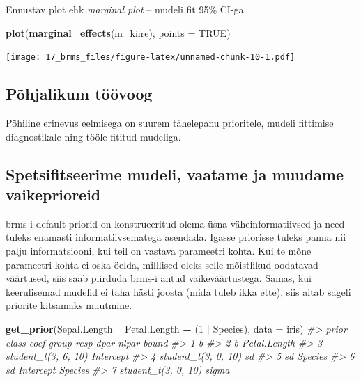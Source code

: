 \documentclass[]{book}
\newenvironment{Shaded}{\begin{snugshade}}{\end{snugshade}}
\newcommand{\KeywordTok}[1]{\textcolor[rgb]{0.13,0.29,0.53}{\textbf{#1}}}
\newcommand{\DataTypeTok}[1]{\textcolor[rgb]{0.13,0.29,0.53}{#1}}
\newcommand{\DecValTok}[1]{\textcolor[rgb]{0.00,0.00,0.81}{#1}}
\newcommand{\StringTok}[1]{\textcolor[rgb]{0.31,0.60,0.02}{#1}}
\newcommand{\CommentTok}[1]{\textcolor[rgb]{0.56,0.35,0.01}{\textit{#1}}}
\newcommand{\OtherTok}[1]{\textcolor[rgb]{0.56,0.35,0.01}{#1}}
\newcommand{\OperatorTok}[1]{\textcolor[rgb]{0.81,0.36,0.00}{\textbf{#1}}}
\newcommand{\NormalTok}[1]{#1}
\begin{document}
Ennustav plot ehk \emph{marginal plot} -- mudeli fit 95\% CI-ga.

\begin{Shaded}
\begin{Highlighting}[]
\KeywordTok{plot}\NormalTok{(}\KeywordTok{marginal_effects}\NormalTok{(m_kiire), }\DataTypeTok{points =} \OtherTok{TRUE}\NormalTok{)}
\end{Highlighting}
\end{Shaded}

\texttt{[image: 17\_brms\_files/figure-latex/unnamed-chunk-10-1.pdf]}

\subsection{Põhjalikum töövoog}\label{pohjalikum-toovoog}

Põhiline erinevus eelmisega on suurem tähelepanu prioritele, mudeli
fittimise diagnostikale ning tööle fititud mudeliga.

\subsection{Spetsifitseerime mudeli, vaatame ja muudame
vaikeprioreid}\label{spetsifitseerime-mudeli-vaatame-ja-muudame-vaikeprioreid}

brms-i default priorid on konstrueeritud olema üsna väheinformatiivsed
ja need tuleks enamasti informatiivsematega asendada. Igasse priorisse
tuleks panna nii palju informatsiooni, kui teil on vastava parameetri
kohta. Kui te mõne parameetri kohta ei oska öelda, milllised oleks selle
mõistlikud oodatavad väärtused, siis saab piirduda brms-i antud
vaikeväärtustega. Samas, kui keerulisemad mudelid ei taha hästi joosta
(mida tuleb ikka ette), siis aitab sageli priorite kitsamaks muutmine.

\begin{Shaded}
\begin{Highlighting}[]
\KeywordTok{get_prior}\NormalTok{(Sepal.Length }\OperatorTok{~}\StringTok{ }\NormalTok{Petal.Length }\OperatorTok{+}\StringTok{ }\NormalTok{(}\DecValTok{1} \OperatorTok{|}\StringTok{ }\NormalTok{Species), }
          \DataTypeTok{data =}\NormalTok{ iris)}
\CommentTok{#>                 prior     class         coef   group resp dpar nlpar bound}
\CommentTok{#> 1                             b                                           }
\CommentTok{#> 2                             b Petal.Length                              }
\CommentTok{#> 3 student_t(3, 6, 10) Intercept                                           }
\CommentTok{#> 4 student_t(3, 0, 10)        sd                                           }
\CommentTok{#> 5                            sd              Species                      }
\CommentTok{#> 6                            sd    Intercept Species                      }
\CommentTok{#> 7 student_t(3, 0, 10)     sigma}
\end{Highlighting}
\end{Shaded}
\end{document}
